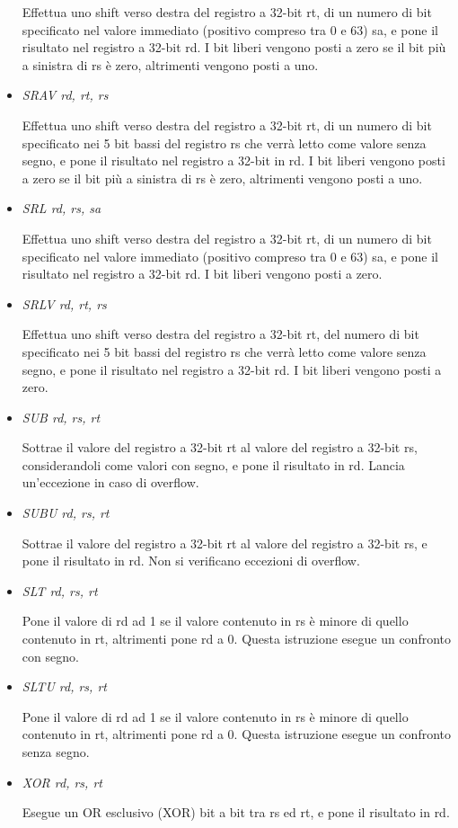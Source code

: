 \documentclass[letterpaper,10pt,italian]{sphinxmanual}
\begin{document}
\begin{itemize}
Effettua uno shift verso destra del registro a 32-bit rt, di un numero di
bit specificato nel valore immediato (positivo compreso tra 0 e 63) sa, e
pone il risultato nel registro a 32-bit rd.  I bit liberi vengono posti a
zero se il bit più a sinistra di rs è zero, altrimenti vengono posti
a uno.

\item {} 
\emph{SRAV rd, rt, rs}

Effettua uno shift verso destra del registro a 32-bit rt, di un numero di
bit specificato nei 5 bit bassi del registro rs che verrà letto come
valore senza segno, e pone il risultato nel registro a 32-bit in rd.  I bit
liberi vengono posti a zero se il bit più a sinistra di rs è zero,
altrimenti vengono posti a uno.

\item {} 
\emph{SRL rd, rs, sa}

Effettua uno shift verso destra del registro a 32-bit rt, di un numero di
bit specificato nel valore immediato (positivo compreso tra 0 e 63) sa, e
pone il risultato nel registro a 32-bit rd. I bit liberi vengono posti a
zero.

\item {} 
\emph{SRLV rd, rt, rs}

Effettua uno shift verso destra del registro a 32-bit rt, del numero di bit
specificato nei 5 bit bassi del registro rs che verrà letto come valore
senza segno, e pone il risultato nel registro a 32-bit rd. I bit liberi
vengono posti a zero.

\item {} 
\emph{SUB rd, rs, rt}

Sottrae il valore del registro a 32-bit rt al valore del registro a 32-bit
rs, considerandoli come valori con segno, e pone il risultato in rd. Lancia
un'eccezione in caso di overflow.

\item {} 
\emph{SUBU rd, rs, rt}

Sottrae il valore del registro a 32-bit rt al valore del registro a 32-bit
rs, e pone il risultato in rd.
Non si verificano eccezioni di overflow.

\end{itemize}
\begin{itemize}
\item {} 
\emph{SLT rd, rs, rt}

Pone il valore di rd ad 1 se il valore contenuto in rs è minore di
quello contenuto in rt, altrimenti pone rd a 0. Questa istruzione esegue un
confronto con segno.

\item {} 
\emph{SLTU rd, rs, rt}

Pone il valore di rd ad 1 se il valore contenuto in rs è minore di
quello contenuto in rt, altrimenti pone rd a 0. Questa istruzione esegue un
confronto senza segno.

\item {} 
\emph{XOR rd, rs, rt}

Esegue un OR esclusivo (XOR) bit a bit tra rs ed rt, e pone il risultato in
rd.

\end{itemize}
\end{document}
